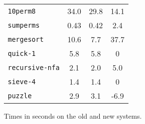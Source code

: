 \begin{figure}[h]
\begin{center}
\begin{tabular}{|l|c|c|c|}
{\tt 10perm8}               &  34.0    &   29.8    &   14.1      \\
{\tt sumperms}              &   0.43   &    0.42   &   2.4       \\
{\tt mergesort}             &  10.6    &    7.7    &   37.7      \\
{\tt quick-1}               &   5.8    &    5.8    &   0         \\
{\tt recursive-nfa}         &   2.1    &    2.0    &   5.0       \\
{\tt sieve-4}               &   1.4    &    1.4    &   0         \\
{\tt puzzle}                &   2.9    &    3.1    &   -6.9      \\
\hline
\end{tabular}
\end{center}
\caption{Times in seconds on the old and new systems.}
\end{figure}


